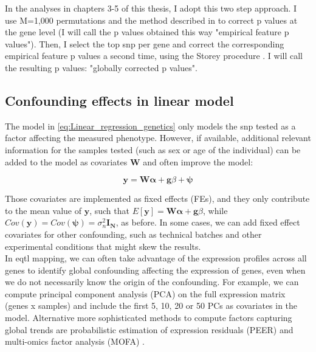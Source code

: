 In the analyses in chapters 3-5 of this thesis, I adopt this two step approach.
I use M=1,000 permutations and the method described in \cite{ongen2016fast} to correct p values at the gene level (I will call the p values obtained this way "empirical feature p values").
Then, I select the top \gls{snp} per gene and correct the corresponding empirical feature p values a second time, using the Storey procedure \cite{storey2002direct}.
I will call the resulting p values: "globally corrected p values".

\subsection{Confounding effects in linear model}

The model in \eqref{eq:Linear_regression_genetics} only models the \gls{snp} tested as a factor affecting the measured phenotype.
However, if available, additional relevant information for the samples tested (such as sex or age of the individual) can be added to the model as covariates $\mathbf{W}$ and often improve the model:

\begin{equation}\label{eq:Linear_regression_genetics_covariates}
 \mathbf{y} =  \mathbf{W}\boldsymbol{\alpha} + \mathbf{g}\beta + \boldsymbol{\psi} 
\end{equation}

Those covariates are implemented as fixed effects (FEs), and they only contribute to the mean value of $\mathbf{y}$, such that $E[\mathbf{y}] = \mathbf{W}\boldsymbol{\alpha} + \mathbf{g}\beta$, while $Cov(\mathbf{y}) = Cov(\boldsymbol{\psi}) = \sigma_n^2 \mathbf{I_N} $, as before.
In some cases, we can add fixed effect covariates for other confounding, such as technical batches and other experimental conditions that might skew the results. \\

In e\gls{qtl} mapping, we can often take advantage of the expression profiles across all genes to identify global confounding affecting the expression of genes, even when we do not necessarily know the origin of the confounding.
For example, we can compute principal component analysis (PCA) on the full expression matrix (genes x samples) and include the first 5, 10, 20 or 50 PCs as covariates in the model.
Alternative more sophisticated methods to compute factors capturing global trends are probabilistic estimation of expression residuals (PEER) \cite{stegle2010bayesian, stegle2012using} and multi-omics factor analysis (MOFA) \cite{argelaguet2018multi}. 

